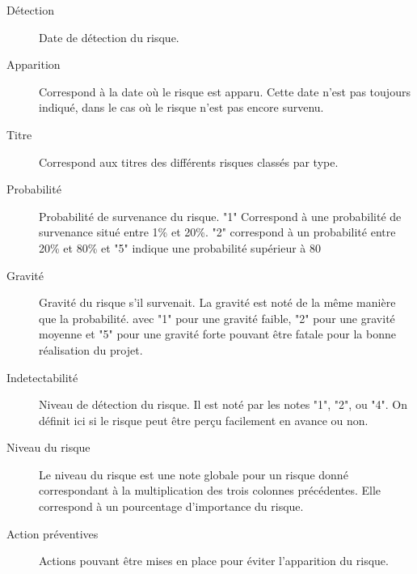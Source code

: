 \documentclass[etudiants]{support-iutrs}
\begin{document}
\begin{description}

\item[Détection]
Date de détection du risque.

\item[Apparition]
Correspond à la date où le risque est apparu. Cette date n'est pas toujours indiqué, dans le cas où le risque n'est pas encore survenu.

\item[Titre]
Correspond aux titres des différents risques classés par type.

\item[Probabilité]
Probabilité de survenance du risque. "1" Correspond à une probabilité de survenance situé entre 1\% et 20\%. "2" correspond à un probabilité entre 20\% et 80\% et "5" indique une probabilité supérieur à 80%

\item[Gravité]
Gravité du risque s'il survenait. La gravité est noté de la même manière que la probabilité. avec "1" pour une gravité faible, "2" pour une gravité moyenne et "5" pour une gravité forte pouvant être fatale pour la bonne réalisation du projet.

\item[Indetectabilité]
Niveau de détection du risque. Il est noté par les notes "1", "2", ou "4". On définit ici si le risque peut être perçu facilement en avance ou non.

\item[Niveau du risque]
Le niveau du risque est une note globale pour un risque donné correspondant à la multiplication des trois colonnes précédentes. Elle correspond à un pourcentage d'importance du risque.

\item[Action préventives]
Actions pouvant être mises en place pour éviter l'apparition du risque.
\end{description}
\end{document}
